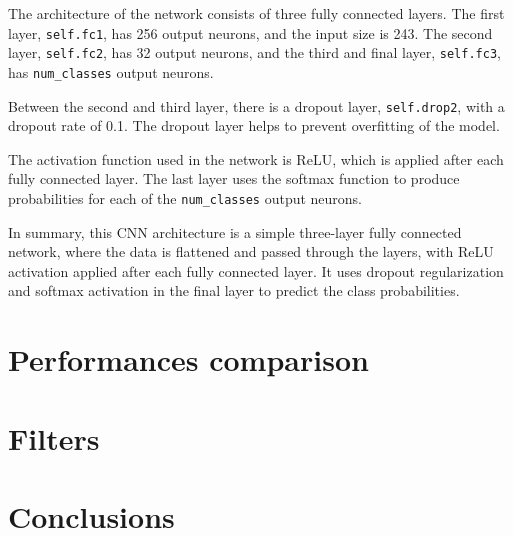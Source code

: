 \documentclass{report}
\begin{document}
The architecture of the network consists of three fully connected layers. The first layer, \texttt{self.fc1}, has 256 output neurons, and the input size is 243. The second layer, \texttt{self.fc2}, has 32 output neurons, and the third and final layer, \texttt{self.fc3}, has \texttt{num\_classes} output neurons.

Between the second and third layer, there is a dropout layer, \texttt{self.drop2}, with a dropout rate of 0.1. The dropout layer helps to prevent overfitting of the model.

The activation function used in the network is ReLU, which is applied after each fully connected layer. The last layer uses the softmax function to produce probabilities for each of the \texttt{num\_classes} output neurons.

In summary, this CNN architecture is a simple three-layer fully connected network, where the data is flattened and passed through the layers, with ReLU activation applied after each fully connected layer. It uses dropout regularization and softmax activation in the final layer to predict the class probabilities.
\chapter{Performances comparison}
\chapter{Filters}
\chapter{Conclusions}
\end{document}
